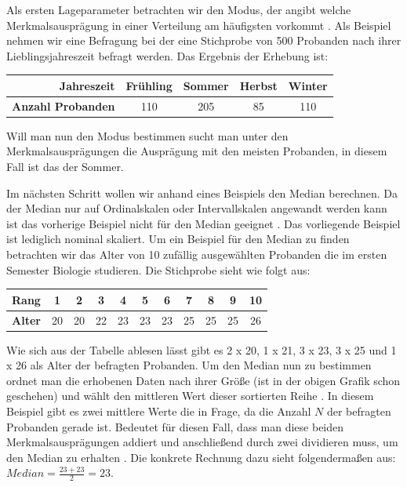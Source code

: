 Als ersten Lageparameter betrachten wir den Modus, der angibt welche Merkmalsausprägung in einer Verteilung am häufigsten vorkommt \citep[vgl.][53]{Fahrmeir2016}. Als Beispiel nehmen wir eine Befragung bei der eine Stichprobe von 500 Probanden nach ihrer Lieblingsjahreszeit befragt werden. Das Ergebnis der Erhebung ist:
\begin{center}
\begin{tabular}{r|c|c|c|c} 
\textbf{Jahreszeit} & Frühling & Sommer & Herbst & Winter \\ \hline
\textbf{Anzahl Probanden} & 110 & 205 & 85 & 110\\
\end{tabular}
\end{center}
Will man nun den Modus bestimmen sucht man unter den Merkmalsausprägungen die Ausprägung mit den meisten Probanden, in diesem Fall ist das der Sommer.

Im nächsten Schritt wollen wir anhand eines Beispiels den Median berechnen. Da der Median nur auf Ordinalskalen oder Intervallskalen angewandt werden kann ist das vorherige Beispiel nicht für den Median geeignet \citep[vgl.][52]{Fahrmeir2016}. Das vorliegende Beispiel ist lediglich nominal skaliert.
Um ein Beispiel für den Median zu finden betrachten wir das Alter von 10 zufällig ausgewählten Probanden die im ersten Semester Biologie studieren. Die Stichprobe sieht wie folgt aus:
\begin{center}
\begin{tabular}{r|c|c|c|c|c|c|c|c|c|c} 
\textbf{Rang} & 1 & 2 & 3 & 4 & 5 & 6 & 7 & 8 & 9 & 10 \\ \hline
\textbf{Alter} & 20 & 20 & 22 & 23 & 23 & 23 & 25 & 25 & 25 & 26\\
\end{tabular}
\end{center}
Wie sich aus der Tabelle ablesen lässt gibt es 2 x 20, 1 x 21, 3 x 23, 3 x 25 und 1 x 26 als Alter der befragten Probanden. Um den Median nun zu bestimmen ordnet man die erhobenen Daten nach ihrer Größe (ist in der obigen Grafik schon geschehen) und wählt den mittleren Wert dieser sortierten Reihe \citep[vgl.][52\psq]{Fahrmeir2016}. In diesem Beispiel gibt es zwei mittlere Werte die in Frage, da die Anzahl $N$ der befragten Probanden gerade ist. Bedeutet für diesen Fall, dass man diese beiden Merkmalsausprägungen addiert und anschließend durch zwei dividieren muss, um den Median zu erhalten \citep[vgl.][53]{Fahrmeir2016}. Die konkrete Rechnung dazu sieht folgendermaßen aus: $Median = \frac{23 + 23}{2} = 23$.

